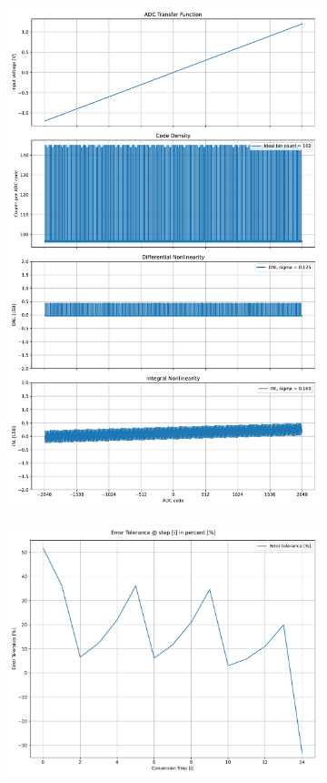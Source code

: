 \documentclass[varwidth]{standalone}
\begin{document}
\begin{figure}
\begin{subfigure}{0.32\textwidth}
    \includegraphics[width=\textwidth]{caeleste_2_nonlinearity.pdf}
\end{subfigure}
\begin{subfigure}{0.32\textwidth}
    \includegraphics[width=\textwidth]{caeleste_2_redundancy.pdf}

\end{subfigure}
\end{figure}
\end{document}
